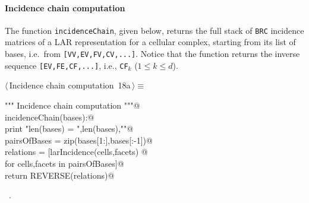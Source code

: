 \documentclass[11pt,oneside]{article}	%
\begin{document}
\paragraph{Incidence chain computation}
The function \texttt{incidenceChain}, given below, returns the full stack of \texttt{BRC} incidence matrices of a LAR representation for a cellular complex, starting from its list of bases, i.e.~from \texttt{[VV,EV,FV,CV,...]}. Notice that the function returns the inverse sequence 
\texttt{[EV,FE,CF,...]}, i.e., \texttt{CF}$_k$ ($1\leq k\leq d$).

\begin{flushleft} \small \label{scrap31}
\protect{}$\langle\,$Incidence chain computation\nobreak\ {\footnotesize 18a}$\,\rangle\equiv$
\vspace{-1ex}
\begin{list}{}{} \item
\mbox{}\verb@""" Incidence chain computation """@\\
\mbox{}\verb@def incidenceChain(bases):@\\
\mbox{}\verb@   print "\n len(bases) = ",len(bases),"\n"@\\
\mbox{}\verb@   pairsOfBases = zip(bases[1:],bases[:-1])@\\
\mbox{}\verb@   relations = [larIncidence(cells,facets) @\\
\mbox{}\verb@               for cells,facets in pairsOfBases]@\\
\mbox{}\verb@   return REVERSE(relations)@\\
\mbox{}\verb@@{\NWsep}
\end{list}
\vspace{-1ex}
\footnotesize\addtolength{\baselineskip}{-1ex}
\begin{list}{}{\setlength{\itemsep}{-\parsep}\setlength{\itemindent}{-\leftmargin}}
\item \NWtxtMacroRefIn\ .
\end{list}
\end{flushleft}
\end{document}
